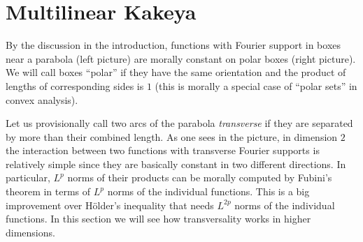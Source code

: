 \section{Multilinear Kakeya}
By the discussion in the introduction, functions with Fourier support in boxes near a parabola (left picture) are morally constant on polar boxes (right picture).
We will call boxes ``polar'' if they have the same orientation and the product of lengths of corresponding sides is $1$ (this is morally a special case of ``polar sets'' in convex analysis).
\begin{center}
\hspace{2cm}
\end{center}
Let us provisionally call two arcs of the parabola \emph{transverse} if they are separated by more than their combined length.
As one sees in the picture, in dimension $2$ the interaction between two functions with transverse Fourier supports is relatively simple since they are basically constant in two different directions.
In particular, $L^{p}$ norms of their products can be morally computed by Fubini's theorem in terms of $L^{p}$ norms of the individual functions.
This is a big improvement over H\"older's inequality that needs $L^{2p}$ norms of the individual functions.
In this section we will see how transversality works in higher dimensions.

